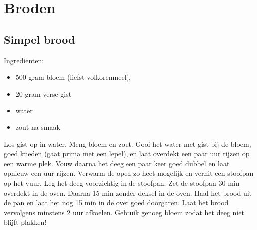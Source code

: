 \section{Broden}

\subsection{Simpel brood}

Ingredienten:
\begin{itemize}
\item 500 gram bloem (liefst volkorenmeel),
\item 20 gram verse gist
\item water
\item zout na smaak
\end{itemize}

Los gist op in water.
Meng bloem en zout.
Gooi het water met gist bij de bloem, goed kneden (gaat prima met een lepel), en laat overdekt een paar uur rijzen op een warme plek.
Vouw daarna het deeg een paar keer goed dubbel en laat opnieuw een uur rijzen.
Verwarm de open zo heet mogelijk en verhit een stoofpan op het vuur.
Leg het deeg voorzichtig in de stoofpan.
Zet de stoofpan 30 min overdekt in de oven.
Daarna 15 min zonder deksel in de oven.
Haal het brood uit de pan en laat het nog 15 min in de over goed doorgaren.
Laat het brood vervolgens minstens 2 uur afkoelen.
Gebruik genoeg bloem zodat het deeg niet blijft plakken!
